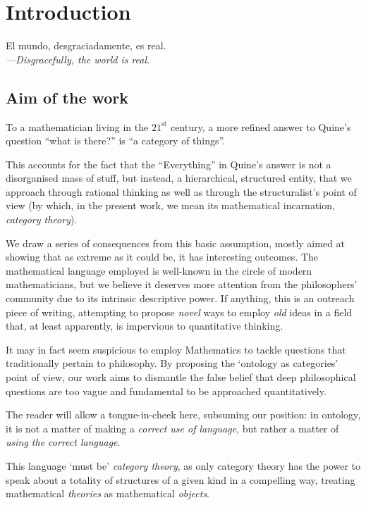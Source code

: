 \section{Introduction}\label{sec_intro}
\epigraph{El mundo, desgraciadamente, es real.\\[2mm]
\footnotesize\emph{---Disgracefully, the world is real.}
}{\cite{confutacion}}
\subsection{Aim of the work}
To a mathematician living in the $21^\text{st}$ century, a more refined answer to Quine's question \cite{} ``what is there?'' is ``a category of things''. 

This accounts for the fact that the ``Everything'' in Quine's answer is not a disorganised mass of stuff, but instead, a hierarchical, structured entity, that we approach through rational thinking as well as through the structuralist's point of view (by which, in the present work, we mean its mathematical incarnation, \emph{category theory}).

We draw a series of consequences from this basic assumption, mostly aimed at showing that as extreme as it could be, it has interesting outcomes. The mathematical language employed is well-known in the circle of modern mathematicians, but we believe it deserves more attention from the philosophers' community due to its intrinsic descriptive power. If anything, this is an outreach piece of writing, attempting to propose \emph{novel} ways to employ \emph{old} ideas in a field that, at least apparently, is impervious to quantitative thinking. 

It may in fact seem suspicious to employ Mathematics to tackle questions that traditionally pertain to philosophy. By proposing the `ontology as categories' point of view, our work aims to dismantle the false belief that deep philosophical questions are too vague and fundamental to be approached quantitatively.

The reader will allow a tongue-in-cheek here, subsuming our position: in ontology, it is not a matter of making a \emph{correct use of language}, but rather a matter of \emph{using the correct language}.

This language `must be' \emph{category theory}, as only category theory has the power to speak about a totality of structures of a given kind in a compelling way, treating mathematical \emph{theories} as mathematical \emph{objects}.

